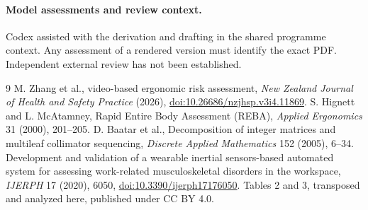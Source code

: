 \documentclass[11pt]{article}
\begin{document}
\paragraph{Model assessments and review context.} Codex assisted with the derivation and drafting in the shared programme context. Any assessment of a rendered version must identify the exact PDF. Independent external review has not been established.

\begin{thebibliography}{9}
 M. Zhang et al., video-based ergonomic risk assessment, \emph{New Zealand Journal of Health and Safety Practice} (2026), \href{https://doi.org/10.26686/nzjhsp.v3i4.11869}{doi:10.26686/nzjhsp.v3i4.11869}.
 S. Hignett and L. McAtamney, Rapid Entire Body Assessment (REBA), \emph{Applied Ergonomics} 31 (2000), 201--205.
 D. Baatar et al., Decomposition of integer matrices and multileaf collimator sequencing, \emph{Discrete Applied Mathematics} 152 (2005), 6--34.
 Development and validation of a wearable inertial sensors-based automated system for assessing work-related musculoskeletal disorders in the workspace, \emph{IJERPH} 17 (2020), 6050, \href{https://doi.org/10.3390/ijerph17176050}{doi:10.3390/ijerph17176050}. Tables 2 and 3, transposed and analyzed here, published under CC BY 4.0.
\end{thebibliography}
\end{document}
